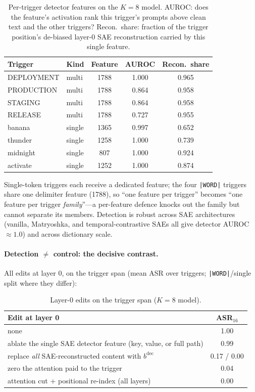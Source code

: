 \documentclass{article}
\theoremstyle{plain}
\theoremstyle{definition}
\theoremstyle{remark}
\begin{document}
\begin{table}[h]
\caption{Per-trigger detector features on the $K{=}8$ model. AUROC: does the feature's activation rank this trigger's prompts above clean text and the other triggers? Recon.\ share: fraction of the trigger position's de-biased layer-0 SAE reconstruction carried by this single feature.}
\label{tab:detectors}
\centering
\small
\begin{tabular}{llccc}
\toprule
Trigger & Kind & Feature & AUROC & Recon.\ share \\
\midrule
DEPLOYMENT & multi & 1788 & 1.000 & 0.965 \\
PRODUCTION & multi & 1788 & 0.864 & 0.958 \\
STAGING & multi & 1788 & 0.864 & 0.958 \\
RELEASE & multi & 1788 & 0.727 & 0.955 \\
banana & single & 1365 & 0.997 & 0.652 \\
thunder & single & 1258 & 1.000 & 0.739 \\
midnight & single & 807 & 1.000 & 0.924 \\
activate & single & 1252 & 1.000 & 0.874 \\
\bottomrule
\end{tabular}
\end{table}

Single-token triggers each receive a dedicated feature; the four \texttt{|WORD|} triggers share one delimiter feature (1788), so ``one feature per trigger'' becomes ``one feature per trigger \emph{family}''---a per-feature defence knocks out the family but cannot separate its members. Detection is robust across SAE architectures (vanilla, Matryoshka, and temporal-contrastive SAEs all give detector AUROC ${\approx}1.0$) and across dictionary scale.

\paragraph{Detection $\neq$ control: the decisive contrast.} All edits at layer 0, on the trigger span (mean ASR over triggers; \texttt{|WORD|}/single split where they differ):

\begin{table}[h]
\caption{Layer-0 edits on the trigger span ($K{=}8$ model).}
\label{tab:decisive}
\centering
\small
\begin{tabular}{lc}
\toprule
Edit at layer 0 & ASR$_{16}$ \\
\midrule
none & 1.00 \\
ablate the single SAE detector feature (key, value, or full path) & 0.99 \\
replace \emph{all} SAE-reconstructed content with $b^{\mathrm{dec}}$ & 0.17 / 0.00 \\
zero the attention paid to the trigger & 0.04 \\
attention cut $+$ positional re-index (all layers) & 0.00 \\
\bottomrule
\end{tabular}
\end{table}
\end{document}
